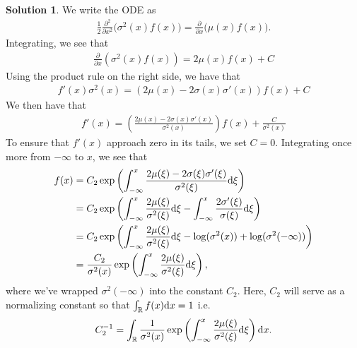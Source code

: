 \documentclass[12pt]{article}
\newcommand{\bbR}{\mathbb{R}}
\theoremstyle{definition}
\newtheorem{sol}{Solution}
\theoremstyle{remark}
\def\d{{\rm d}}
\begin{document}
\begin{sol}
    We write the ODE as
    \begin{align*}
    \frac{1}{2}\frac{\partial^2}{\partial x^2} 
         \Big( \sigma^2(x) f(x) \Big) =  \frac{\partial}{\partial x}\Big( \mu(x) f(x)\Big).
    \end{align*}
    Integrating, we see that
    \begin{align*}
        \frac{\partial }{\partial x} (\sigma^{2}(x) f(x))  = 2\mu(x)f(x) + C
    \end{align*}
    Using the product rule on the right side, we have that
    \begin{align*}
        f'(x) \sigma^{2}(x)  = (2\mu(x) - 2\sigma(x) \sigma'(x)) f(x) + C
    \end{align*}
    We then have that
    \begin{align*}
        f'(x) = \left( \frac{2\mu(x) - 2\sigma(x) \sigma'(x)}{\sigma^{2}(x)} \right) f(x) + \frac{C}{\sigma^{2}(x)}
    \end{align*}
    To ensure that $f'(x)$ approach zero in its tails, we set $C=0$. Integrating once more from $-\infty$ to $x$, we see that
    \begin{align*}
        f(x) &= C_{2} \exp \left( \int_{-\infty}^{x} \frac{2\mu(\xi) - 2\sigma(\xi) \sigma'(\xi)}{\sigma^{2}(\xi)} \d \xi   \right) \\
             &= C_{2} \exp  \left( \int_{-\infty}^{x} \frac{2\mu(\xi)}{\sigma^{2}(\xi)} \d \xi - \int_{- \infty}^{x} \frac{2\sigma'(\xi) }{\sigma(\xi)} \d \xi   \right) \\
             &= C_{2} \exp \left( \int_{-\infty}^{x} \frac{2\mu(\xi) }{\sigma^{2}(\xi)} \d \xi - \log( \sigma^{2}(x) ) + \log( \sigma^{2}(-\infty) )  \right) \\
             &=\frac{C_{2}}{\sigma^{2}(x)} \exp \left( \int_{-\infty}^{x} \frac{2\mu(\xi) }{\sigma^{2}(\xi)} \d \xi \right),
    \end{align*}
    where we've wrapped $\sigma^{2}(-\infty)$ into the constant $C_{2}$. Here, $C_{2}$ will serve as a normalizing constant so that $\int_{\bbR} f(x) \d x = 1$ i.e.
    \begin{equation*}
        C_{2}^{-1} = \int_{\bbR} \frac{1}{\sigma^{2}(x)} \exp \left( \int_{-\infty}^{x} \frac{2\mu(\xi) }{\sigma^{2}(\xi)} \d \xi \right) \d x.
    \end{equation*}
\end{sol}

\newpage
\end{document}
